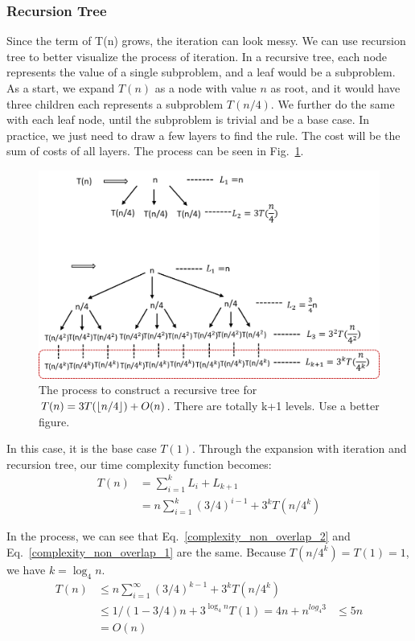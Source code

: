 \documentclass[../main.tex]{subfiles}
\begin{document}
\subsubsection{Recursion Tree}
Since the term of T(n) grows, the iteration can look messy. We can use recursion tree to better visualize the process of iteration. In a recursive tree, each node represents the value of a single subproblem, and a leaf would be a subproblem. As a start, we expand $T(n)$ as a node with value $n$ as root, and it would have three children each represents a subproblem $T(n/4)$. We further do the same with each leaf node, until the subproblem is trivial and be a base case. In practice, we just need to draw a few layers to find the rule. The cost will be the sum of costs of all layers.  The process can be seen in  Fig.~\ref{fig:recursive_tree}. 
\begin{figure}[!ht]
    \centering
    \includegraphics[width=0.98\columnwidth]{fig/recursion_tree_non_overlap.png}
    \caption{The process to construct a recursive tree for $T(n) = 3T(\floor*{n/4}) + O(n)$. There are totally k+1 levels. Use a better figure.  }
    \label{fig:recursive_tree}
\end{figure}
 In this case, it is the base case $T(1)$. Through the expansion with iteration and recursion tree, our time complexity function becomes:
\begin{align}
\label{complexity_non_overlap_2}
    T(n)&=\sum_{i=1}^{k}L_i + L_{k+1}\\
    &=n\sum_{i=1}^{k}(3/4)^{i-1}+3^kT(n/4^k)
\end{align}

In the process, we can see that Eq.~\ref{complexity_non_overlap_2} and Eq.~\ref{complexity_non_overlap_1} are the same.  Because $T(n/4^k)=T(1)=1$, we have $k=\log_4 n$. 
\begin{align}
\label{complexity_non_overlap_2}
    T(n)&\leq n\sum_{i=1}^{\infty}(3/4)^{k-1}+3^kT(n/4^k)\\
    &\leq 1/(1-3/4)n+3^{\log_4 n} T(1)= 4n+n^{log_4 3}
    &\leq 5n \\
    &=O(n)
\end{align}
\end{document}
